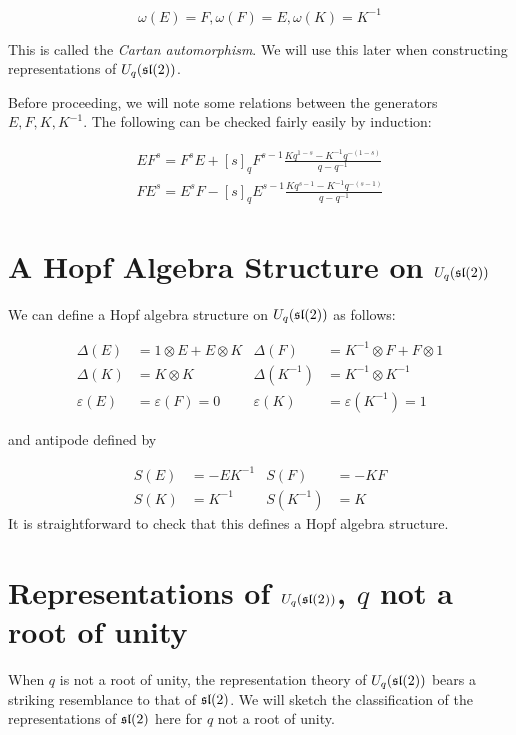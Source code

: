 \begin{equation}
    \omega(E) = F, \omega(F) = E, \omega(K) = K^{-1}
\end{equation}

This is called the \emph{Cartan automorphism}. We will use this later when
constructing representations of $U_q(\mathfrak{sl}(2))$.

Before proceeding, we will note some relations between the generators
$E,F,K,K^{-1}$. The following can be checked fairly easily by induction:

\begin{align}
    \label{EFrelations}
    EF^s = F^sE + [s]_q F^{s-1} \frac{Kq^{1-s} - K^{-1} q^{-(1-s)}}{q-q^{-1}} \\
    FE^s = E^sF - [s]_q E^{s-1} \frac{Kq^{s-1} - K^{-1} q^{-(s-1)}}{q-q^{-1}}
\end{align}

\section{A Hopf Algebra Structure on $U_q(\mathfrak{sl}(2))$}
We can define a Hopf algebra structure on $U_q(\mathfrak{sl}(2))$ as follows:

\begin{align}
    \Delta(E) &= 1 \otimes E + E \otimes K &  \Delta(F) &= K^{-1} \otimes F + F \otimes 1 \\
    \Delta(K) &= K \otimes K &  \Delta(K^{-1}) &= K^{-1} \otimes K^{-1}\\ 
    \varepsilon(E) &= \varepsilon(F) = 0 &  \varepsilon(K) &= \varepsilon(K^{-1}) = 1
\end{align}

and antipode defined by 

\begin{align}
    S(E) &= -EK^{-1} & S(F)      &= -KF \\
    S(K) &= K^{-1}   & S(K^{-1}) &= K 
\end{align}
It is straightforward to check that this defines a Hopf algebra structure. 

\section{Representations of $U_q(\mathfrak{sl}(2))$, $q$ not a root of unity}

When $q$ is not a root of unity, the representation theory of $U_q(\mathfrak{sl}(2))$
bears a striking resemblance to that of $\mathfrak{sl}(2)$. We will sketch the
classification of the representations of $\mathfrak{sl}(2)$ here for $q$ not a root of
unity.


